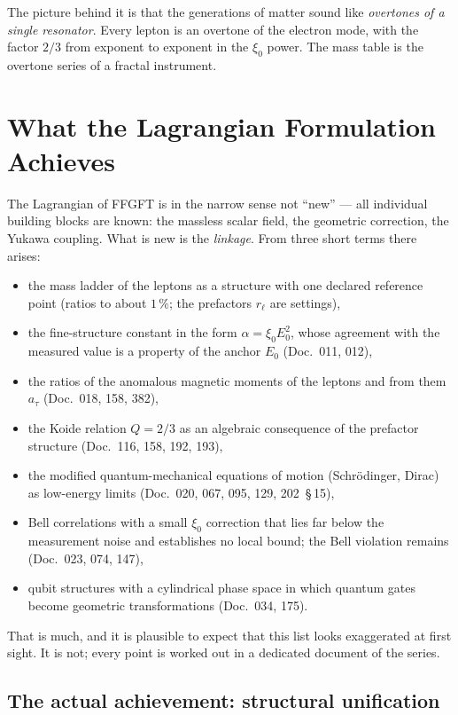 The picture behind it is that the generations of matter sound like
\emph{overtones of a single resonator}. Every lepton is an overtone
of the electron mode, with the factor $2/3$ from exponent to exponent in the
$\xi_0$ power. The mass table is the overtone series of a fractal
instrument.

\section{What the Lagrangian Formulation Achieves}

The Lagrangian of FFGFT is in the narrow sense not \enquote{new}
--- all individual building blocks are known: the massless scalar
field, the geometric correction, the Yukawa coupling. What is new
is the \emph{linkage}. From three short terms there arises:
\begin{itemize}
  \item the mass ladder of the leptons as a structure with one
        declared reference point (ratios to about $1\,\%$; the
        prefactors $r_\ell$ are settings),
  \item the fine-structure constant in the form $\alpha = \xi_0 E_0^2$,
        whose agreement with the measured value is a property of the
        anchor $E_0$ (Doc.~011, 012),
  \item the ratios of the anomalous magnetic moments of the leptons
        and from them $a_\tau$ (Doc.~018, 158, 382),
  \item the Koide relation $Q = 2/3$ as an algebraic consequence of
        the prefactor structure (Doc.~116, 158, 192, 193),
  \item the modified quantum-mechanical equations of motion
        (Schrödinger, Dirac) as low-energy limits
        (Doc.~020, 067, 095, 129, 202~\S\,15),
  \item Bell correlations with a small $\xi_0$ correction that lies
        far below the measurement noise and establishes no local
        bound; the Bell violation remains (Doc.~023, 074, 147),
  \item qubit structures with a cylindrical phase space in which
        quantum gates become geometric transformations
        (Doc.~034, 175).
\end{itemize}

That is much, and it is plausible to expect that this list looks
exaggerated at first sight. It is not; every point is worked out
in a dedicated document of the series.

\subsection*{The actual achievement: structural unification}

